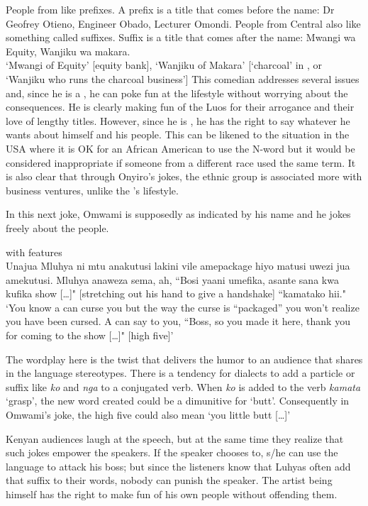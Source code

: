 \documentclass[output=paper]{langsci/langscibook}
\begin{document}
\ex
 People from  like prefixes. A prefix is a title that comes before the name: Dr Geofrey Otieno, Engineer Obado, Lecturer Omondi. People from Central also like something called suffixes. Suffix is a title that comes after the name: 
 \ex Mwangi wa Equity, Wanjiku wa makara.\\
\glt ‘Mwangi of Equity’ [equity bank], ‘Wanjiku of Makara’ [‘charcoal’ in , or ‘Wanjiku who runs the charcoal business’] \citep{Churchill2013}
\z
\z 
This comedian addresses several issues and, since he is a , he can poke fun at the  lifestyle without worrying about the consequences. He is clearly making fun of the Luos for their arrogance and their love of lengthy titles. However, since he is , he has the right to say whatever he wants about himself and his people. This can be likened to the situation in the USA where it is OK for an African American to use the N-word but it would be considered inappropriate if someone from a different race used the same term. It is also clear that through Onyiro’s jokes, the  ethnic group is associated more with business ventures, unlike the ’s lifestyle. 

In this next joke, Omwami is supposedly  as indicated by his name and he jokes freely about the  people.

\newpage 
\ea
{ with  features}\\
\smallskip
 Unajua Mluhya ni mtu anakutusi lakini vile amepackage hiyo matusi uwezi jua amekutusi. Mluhya anaweza sema, ah, “Bosi yaani umefika, asante sana kwa kufika show […]" \textup{[stretching out his hand to give a handshake]} “kamatako hii."\\
\glt ‘You know a  can curse you but the way the curse is “packaged” you won’t realize you have been cursed. A  can say to you, “Boss, so you made it here, thank you for coming to the show […]" [high five]’ \citep{ChurchillRaw2014}
\z

The wordplay here is the twist that delivers the humor to an audience that shares in the language stereotypes. There is a tendency for  dialects to add a particle or suffix like \textit{ko} and \textit{nga} to a conjugated verb. When \textit{ko} is added to the verb \textit{kamata} `grasp', the new word created could be a dimunitive for ‘butt’. Consequently in Omwami’s joke, the high five could also mean ‘you little butt […]’

Kenyan audiences laugh at the  speech, but at the same time they realize that such jokes empower the  speakers. If the speaker chooses to, s/he can use the language to attack his boss; but since the listeners know that Luhyas often add that suffix to their words, nobody can punish the speaker. The artist being  himself has the right to make fun of his own people without offending them. 
\end{document}
